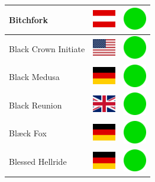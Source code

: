 \documentclass[12pt, a4paper, twoside]{report}
\begin{document}
\begin{center}
\begin{longtable}{|p{5cm}|p{2cm}|p{2cm}|}
Bitchfork & \includegraphics[width=1cm]{4x3/at} & \includegraphics[width=1cm]{likes/y} \\ \hline
Black Crown Initiate & \includegraphics[width=1cm]{4x3/us} & \includegraphics[width=1cm]{likes/y} \\ \hline
Black Medusa & \includegraphics[width=1cm]{4x3/de} & \includegraphics[width=1cm]{likes/y} \\ \hline
Black Reunion & \includegraphics[width=1cm]{4x3/gb} & \includegraphics[width=1cm]{likes/y} \\ \hline
Blæck Fox & \includegraphics[width=1cm]{4x3/de} & \includegraphics[width=1cm]{likes/y} \\ \hline
Blessed Hellride & \includegraphics[width=1cm]{4x3/de} & \includegraphics[width=1cm]{likes/y} \\ \hline

\end{longtable}
\end{center}
\end{document}
